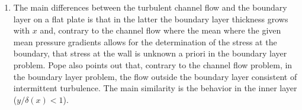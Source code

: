 \documentclass[11pt]{article}
\begin{document}
\begin{enumerate}[label=(\alph*)]
\item The main differences between the turbulent channel flow and the boundary layer on a flat plate is that in the latter the boundary layer thickness grows with $x$ and, contrary to the channel flow where the mean where the given mean pressure gradients allows for the determination of the stress at the boundary, that stress at the wall is unknown a priori in the boundary layer problem. Pope also points out that, contrary to the channel flow problem, in the boundary layer problem, the flow outside the boundary layer consistent of intermittent turbulence. The main similarity is the behavior in the inner layer ($y/\delta(x)<1$).

\end{enumerate}
\end{document}
